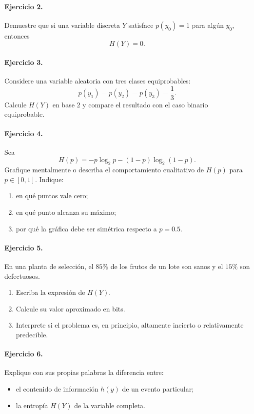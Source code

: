 \documentclass{article}
\begin{document}
\paragraph{Ejercicio 2.}
Demuestre que si una variable discreta \(Y\) satisface \(p(y_0)=1\) para algún \(y_0\), entonces
\[
H(Y)=0.
\]

\paragraph{Ejercicio 3.}
Considere una variable aleatoria con tres clases equiprobables:
\[
p(y_1)=p(y_2)=p(y_3)=\frac{1}{3}.
\]
Calcule \(H(Y)\) en base \(2\) y compare el resultado con el caso binario equiprobable.

\paragraph{Ejercicio 4.}
Sea
\[
H(p)= -p\log_2 p -(1-p)\log_2(1-p).
\]
Grafique mentalmente o describa el comportamiento cualitativo de \(H(p)\) para \(p\in[0,1]\). Indique:
\begin{enumerate}
\item en qué puntos vale cero;
\item en qué punto alcanza su máximo;
\item por qué la gráfica debe ser simétrica respecto a \(p=0.5\).
\end{enumerate}

\paragraph{Ejercicio 5.}
En una planta de selección, el \(85\%\) de los frutos de un lote son sanos y el \(15\%\) son defectuosos.

\begin{enumerate}
\item Escriba la expresión de \(H(Y)\).
\item Calcule su valor aproximado en bits.
\item Interprete si el problema es, en principio, altamente incierto o relativamente predecible.
\end{enumerate}

\paragraph{Ejercicio 6.}
Explique con sus propias palabras la diferencia entre:

\begin{itemize}
\item el contenido de información \(h(y)\) de un evento particular;
\item la entropía \(H(Y)\) de la variable completa.
\end{itemize}
\end{document}
